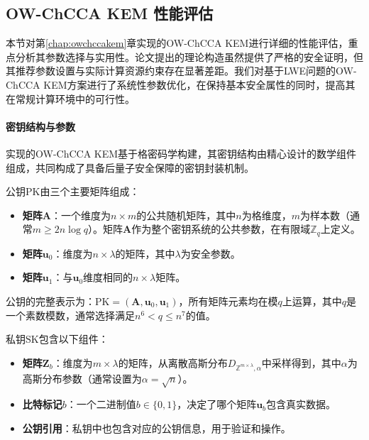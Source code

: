 \subsection{OW-ChCCA KEM 性能评估}

本节对第\ref{chap:owchccakem}章实现的OW-ChCCA KEM进行详细的性能评估，重点分析其参数选择与实用性。论文\cite{pan_lattice-based_2023}提出的理论构造虽然提供了严格的安全证明，但其推荐参数设置与实际计算资源约束存在显著差距。我们对基于LWE问题的OW-ChCCA KEM方案进行了系统性参数优化，在保持基本安全属性的同时，提高其在常规计算环境中的可行性。

\paragraph{密钥结构与参数}
\label{chap:key-structure-params}
实现的OW-ChCCA KEM基于格密码学构建，其密钥结构由精心设计的数学组件组成，共同构成了具备后量子安全保障的密钥封装机制。

公钥$\mathrm{PK}$由三个主要矩阵组成：

\begin{itemize}
    \item \textbf{矩阵$\mathbf{A}$}：一个维度为$n \times m$的公共随机矩阵，其中$n$为格维度，$m$为样本数（通常$m \geq 2n\log q$）。矩阵$\mathbf{A}$作为整个密钥系统的公共参数，在有限域$\mathbb{Z}_q$上定义。
    
    \item \textbf{矩阵$\mathbf{u}_0$}：维度为$n \times \lambda$的矩阵，其中$\lambda$为安全参数。
    
    \item \textbf{矩阵$\mathbf{u}_1$}：与$\mathbf{u}_0$维度相同的$n \times \lambda$矩阵。
\end{itemize}

公钥的完整表示为：$\mathrm{PK} = (\mathbf{A}, \mathbf{u}_0, \mathbf{u}_1)$，所有矩阵元素均在模$q$上运算，其中$q$是一个素数模数，通常选择满足$n^6 < q \leq n^7$的值。

私钥$\mathrm{SK}$包含以下组件：

\begin{itemize}
    \item \textbf{矩阵$\mathbf{Z}_b$}：维度为$m \times \lambda$的矩阵，从离散高斯分布$D_{\mathbb{Z}^{m \times \lambda}, \alpha}$中采样得到，其中$\alpha$为高斯分布参数（通常设置为$\alpha = \sqrt{n}$）。
    
    \item \textbf{比特标记$b$}：一个二进制值$b \in \{0,1\}$，决定了哪个矩阵$\mathbf{u}_b$包含真实数据。
    
    \item \textbf{公钥引用}：私钥中也包含对应的公钥信息，用于验证和操作。
\end{itemize}


